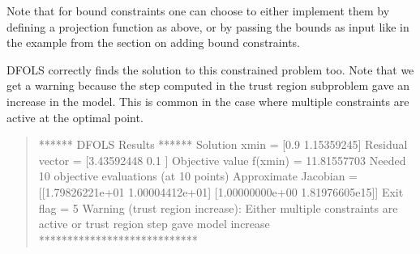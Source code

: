 \documentclass[letterpaper,10pt,english]{sphinxmanual}
\begin{document}
\sphinxAtStartPar
Note that for bound constraints one can choose to either implement them by defining a projection function as above, or by passing the bounds as input like in the example from the section on adding bound constraints.

\sphinxAtStartPar
DFO\sphinxhyphen{}LS correctly finds the solution to this constrained problem too. Note that we get a warning because the step computed in the trust region subproblem
gave an increase in the model. This is common in the case where multiple constraints are active at the optimal point.
\begin{quote}

\begin{sphinxVerbatim}[commandchars=\\\{\}]
****** DFO\PYGZhy{}LS Results ******
Solution xmin = [0.9        1.15359245]
Residual vector = [3.43592448 0.1       ]
Objective value f(xmin) = 11.81557703
Needed 10 objective evaluations (at 10 points)
Approximate Jacobian = [[\PYGZhy{}1.79826221e+01  1.00004412e+01]
 [\PYGZhy{}1.00000000e+00 \PYGZhy{}1.81976605e\PYGZhy{}15]]
Exit flag = 5
Warning (trust region increase): Either multiple constraints are active or trust region step gave model increase
****************************
\end{sphinxVerbatim}
\end{quote}
\end{document}
